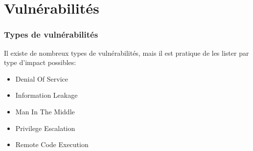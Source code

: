 
\section{Vulnérabilités}

\begin{frame}
\frametitle{Types de vulnérabilités}

Il existe de nombreux types de vulnérabilités, mais il est pratique de les lister par type d'impact possibles:
\begin{itemize}
 \item Denial Of Service %
 \item Information Leakage %
 \item Man In The Middle %
 \item Privilege Escalation %
 \item Remote Code Execution %

\end{itemize}

\end{frame}

